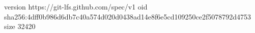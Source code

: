 version https://git-lfs.github.com/spec/v1
oid sha256:4dff0b986d6db7c40a574d020d0438ad14e8f6e5cd109250ce2f5078792d4753
size 32420
